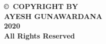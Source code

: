 \newpage
\thispagestyle{empty}

\begin{center}
{\bf \copyright~COPYRIGHT BY \\
AYESH GUNAWARDANA \\
2020 \\
All Rights Reserved \\
}
\end{center}
